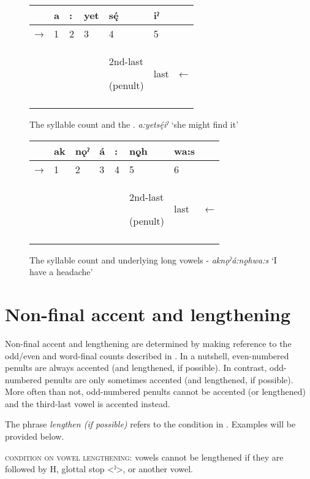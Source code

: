 \begin{figure}
\caption{The syllable count and the  {\indefinite}. \textit{a:yetsę́iˀ} ‘she might find it’}
\label{figtab:1:syllindef}
\begin{tabularx}{\textwidth}{XXXXXXX} 
\lsptoprule
& a & : & yet & sę́ & iˀ & \\
\midrule

 → & 1 & 2 & 3 & 4 & 5 & \\
 \midrule
&  &  &  & 2nd-last 

(penult) & last & ←\\
\lspbottomrule
\end{tabularx}
\end{figure}

\begin{figure}
\caption{The syllable count and underlying long vowels - \textit{aknǫˀá:nǫ̱hwa:s} ‘I have a headache’}
\label{figtab:1:longvsyll}
\begin{tabularx}{\textwidth}{XXXXXXXX}
\lsptoprule
& ak & nǫˀ & á & : & nǫ̱h & wa:s & \\
\midrule
 → & 1 & 2 & 3 & 4 & 5 & 6 & \\
 \midrule
&  &  &  &  & 2nd-last 

(penult) & last & ←\\
\lspbottomrule
\end{tabularx}
\end{figure}


\section{Non-final accent and lengthening} \label{Non-final accent and lengthening}
Non-final accent and lengthening are determined by making reference to the odd/even and word-final counts described in . In a nutshell, even-numbered penults are always accented (and lengthened, if possible). In contrast, odd-num\-bered penults are only sometimes accented (and lengthened, if possible). More often than not, odd-numbered penults cannot be accented (or lengthened) and the third-last vowel is accented instead.

The phrase \textit{lengthen (if possible)} refers to the condition in . Examples will be provided below.


\ea\label{vowellengthcondition} \textsc{condition on vowel lengthening}: vowels cannot be lengthened if they are followed by H, glottal stop <ˀ>, or another vowel. 
\z


